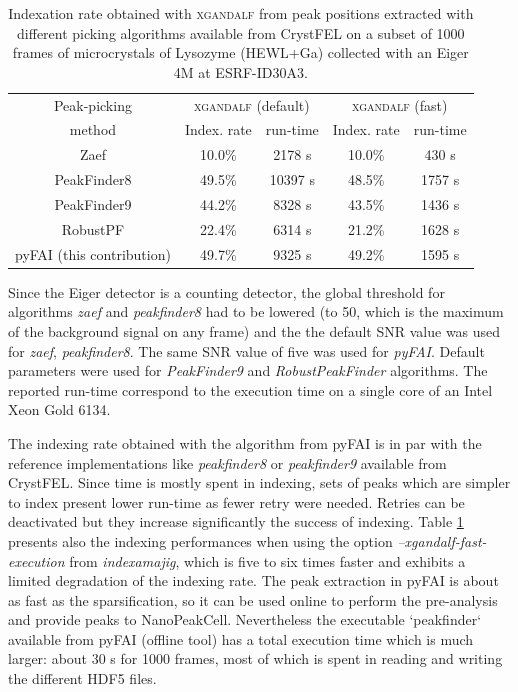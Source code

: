 \documentclass[preprint]{iucr}              %
\begin{document}
\begin{table}
\label{crystfel}
\caption{Indexation rate obtained with \textsc{xgandalf} \cite{xgandalf} from peak positions extracted with different picking algorithms available from CrystFEL \cite{CrystFEL} on a subset of 1000 frames of microcrystals of Lysozyme (HEWL+Ga) collected with an Eiger 4M at ESRF-ID30A3.}%
\begin{center}
\begin{tabular}{|c|c|c|c|c|} 
\hline
Peak-picking  & \multicolumn{2}{c|}{\textsc{xgandalf} (default)} & \multicolumn{2}{c|}{\textsc{xgandalf} (fast)}\\
method & Index. rate & run-time & Index. rate & run-time \\ 
\hline
Zaef \cite{zaefferer} & 10.0\% & 2178 s & 10.0\%& 430 s\\
PeakFinder8 \cite{Cheetah2014} & 49.5\%& 10397 s &48.5\% & 1757 s\\
PeakFinder9 \cite{FDIP} & 44.2\%& 8328 s&43.5\%&1436 s\\
RobustPF \cite{robustpeakfinder} & 22.4\%& 6314 s& 21.2\%& 1628 s \\
pyFAI (this contribution) & 49.7\%& 9325 s& 49.2\% &1595 s\\
\hline
\end{tabular}
\end{center}
\end{table}

Since the Eiger detector is a counting detector, the global threshold for algorithms \textit{zaef} and \textit{peakfinder8} had to be lowered (to 50, which is the maximum of the background signal on any frame) and the the default SNR value was used for \textit{zaef}, \textit{peakfinder8}. 
The same SNR value of five was used for \textit{pyFAI}.
Default parameters were used for \textit{PeakFinder9} and \textit{RobustPeakFinder} algorithms.
The reported run-time correspond to the execution time on a single core of an Intel Xeon Gold 6134.


The indexing rate obtained with the algorithm from pyFAI is in par with the reference implementations like \textit{peakfinder8} or \textit{peakfinder9} available from CrystFEL. 
Since time is mostly spent in indexing, sets of peaks which are simpler to index present lower run-time as fewer retry were needed.
Retries can be deactivated but they increase significantly the success of indexing. 
Table \ref{crystfel} presents also the indexing performances when using the option \textit{--xgandalf-fast-execution} from \textit{indexamajig}, which is five to six times faster and exhibits a limited degradation of the indexing rate.
The peak extraction in pyFAI is about as fast as the sparsification, so it can be used online to perform the pre-analysis and provide peaks to NanoPeakCell. 
Nevertheless the executable `peakfinder` available from pyFAI (offline tool) has a total execution time which is much larger: about 30 s for 1000 frames, most of which is spent in reading and writing the different HDF5 files.
\end{document}
